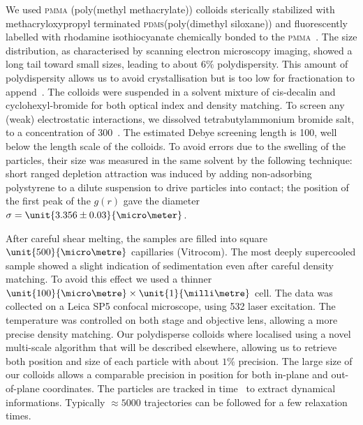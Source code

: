 We used \textsc{pmma} (poly(methyl methacrylate)) colloids sterically stabilized with methacryloxypropyl terminated \textsc{pdms}(poly(dimethyl siloxane)) and fluorescently labelled with rhodamine isothiocyanate chemically bonded to the \textsc{pmma}~\citep{bosma2002}. The size distribution, as characterised by scanning electron microscopy imaging, showed a long tail toward small sizes, leading to about $6\%$ polydispersity. This amount of polydispersity allows us to avoid crystallisation but is too low for fractionation to append~\citep{Fasolo2003}. The colloids were suspended in a solvent mixture of cis-decalin and cyclohexyl-bromide for both optical index and density matching. To screen any (weak) electrostatic interactions, we dissolved tetrabutylammonium bromide salt, to a concentration of \unit{300}{\nano\mole\per\liter}~\citep{royall2005}. The estimated Debye screening length is \unit{100}{\nano\metre}, well below the length scale of the colloids. To avoid errors due to the swelling of the particles, their size was measured in the same solvent by the following technique: short ranged depletion attraction was induced by adding non-adsorbing polystyrene to a dilute suspension to drive particles into contact; the position of the first peak of the $g(r)$ gave the diameter $\sigma = \unit{3.356\pm0.03}{\micro\meter}$.

After careful shear melting, the samples are filled into square $\unit{500}{\micro\metre}$ capillaries (Vitrocom). The most deeply supercooled sample showed a slight indication of sedimentation even after careful density matching. To avoid this effect we used a thinner $\unit{100}{\micro\metre}\times\unit{1}{\milli\metre}$ cell. The data was collected on a Leica SP5 confocal microscope, using \unit{532}{\nano\meter} laser excitation. The temperature was controlled on both stage and objective lens, allowing a more precise density matching. Our polydisperse colloids where localised using a novel multi-scale algorithm that will be described elsewhere, allowing us to retrieve both position and size of each particle with about $1\%$ precision. The large size of our colloids allows a comparable precision in position for both in-plane and out-of-plane coordinates. The particles are tracked in time~\citep{Crocker1996} to extract dynamical informations. Typically $\approx 5000$ trajectories can be followed for a few relaxation times.



